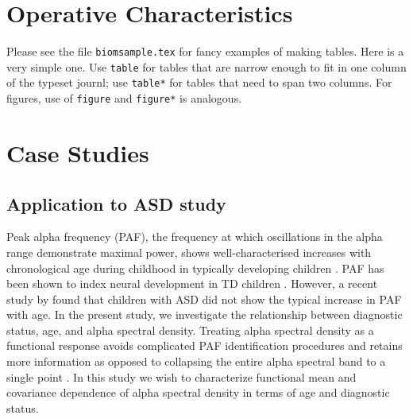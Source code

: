 \documentclass[useAMS,referee,usenatbib]{biom}
\begin{document}
\section{Operative Characteristics}
\label{s:simulation}

Please see the file \texttt{biomsample.tex} for fancy examples of making
tables.  Here is a very simple one.  Use \texttt{table} for tables
that are narrow enough to fit in one column of the typeset journl; use
\texttt{table*} for tables that need to span two columns.  For
figures, use of \texttt{figure} and \texttt{figure*} is analogous. 



\section{Case Studies}
\subsection{Application to ASD study}
Peak alpha frequency (PAF), the frequency at which oscillations in the alpha range demonstrate maximal power, shows well-characterised increases with chronological age during childhood in typically developing children \citep{Somsen1997, Dustman1999, Stroganova1999, Chiang2011, Cragg2011, Miskovic2015}. PAF has been shown to index neural development in TD children \citep{Valdes2010, Segalowitz2010, Rodriguez2017}. However, a recent study by \citet{Dickinson2017} found that children with ASD did not show the typical increase in PAF with age. In the present study, we investigate the relationship between diagnostic status, age, and alpha spectral density. Treating alpha spectral density as a functional response avoids complicated PAF identification procedures \citet{Dickinson2017} and retains more information as opposed to collapsing the entire alpha spectral band to a single point \citep{Scheffler2019, Scheffler2020}. In this study we wish to characterize functional mean and covariance dependence of alpha spectral density in terms of age and diagnostic status. 
\end{document}
